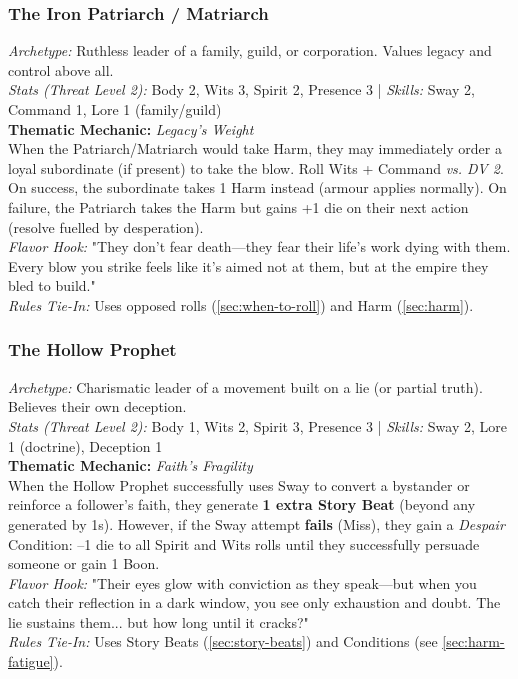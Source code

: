 \subsubsection{The Iron Patriarch / Matriarch}
\textit{Archetype:} Ruthless leader of a family, guild, or corporation. Values legacy and control above all.\\
\textit{Stats (Threat Level 2):} Body 2, Wits 3, Spirit 2, Presence 3 \quad | \quad \textit{Skills:} Sway 2, Command 1, Lore 1 (family/guild)\\
\textbf{Thematic Mechanic:} \textit{Legacy's Weight} \\
When the Patriarch/Matriarch would take Harm, they may immediately order a loyal subordinate (if present) to take the blow. Roll Wits + Command \textit{vs. DV 2}. On success, the subordinate takes 1 Harm instead (armour applies normally). On failure, the Patriarch takes the Harm but gains +1 die on their next action (resolve fuelled by desperation).\\
\textit{Flavor Hook:} "They don't fear death---they fear their life's work dying with them. Every blow you strike feels like it's aimed not at them, but at the empire they bled to build."\\
\textit{Rules Tie-In:} Uses opposed rolls (\autoref{sec:when-to-roll}) and Harm (\autoref{sec:harm}).

\subsubsection{The Hollow Prophet}
\textit{Archetype:} Charismatic leader of a movement built on a lie (or partial truth). Believes their own deception.\\
\textit{Stats (Threat Level 2):} Body 1, Wits 2, Spirit 3, Presence 3 \quad | \quad \textit{Skills:} Sway 2, Lore 1 (doctrine), Deception 1\\
\textbf{Thematic Mechanic:} \textit{Faith's Fragility} \\
When the Hollow Prophet successfully uses Sway to convert a bystander or reinforce a follower's faith, they generate \textbf{1 extra Story Beat} (beyond any generated by 1s). However, if the Sway attempt \textbf{fails} (Miss), they gain a \textit{Despair} Condition: --1 die to all Spirit and Wits rolls until they successfully persuade someone or gain 1 Boon.\\
\textit{Flavor Hook:} "Their eyes glow with conviction as they speak---but when you catch their reflection in a dark window, you see only exhaustion and doubt. The lie sustains them... but how long until it cracks?"\\
\textit{Rules Tie-In:} Uses Story Beats (\autoref{sec:story-beats}) and Conditions (see \autoref{sec:harm-fatigue}).

